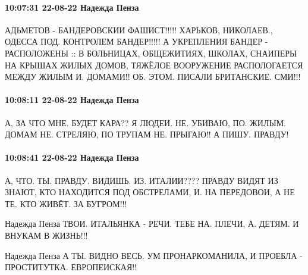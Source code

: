  
 
 
 
 

\paragraph{10:07:31 22-08-22 Надежда Пенза}

АДЬМЕТОВ - БАНДЕРОВСКИИ ФАШИСТ!!!!!
ХАРЬКОВ, НИКОЛАЕВ., ОДЕССА ПОД. КОНТРОЛЕМ БАНДЕР!!!!!
А УКРЕПЛЕНИЯ БАНДЕР -
РАСПОЛОЖЕНЫ :: В БОЛЬНИЦАХ, ОБЩЕЖИТИЯХ, ШКОЛАХ, СНАИПЕРЫ НА КРЫШАХ ЖИЛЫХ ДОМОВ, ТЯЖЁЛОЕ ВООРУЖЕНИЕ РАСПОЛОГАЕТСЯ МЕЖДУ ЖИЛЫМ И. ДОМАМИ!!
ОБ. ЭТОМ. ПИСАЛИ
БРИТАНСКИЕ. СМИ!!!

\paragraph{10:08:11 22-08-22 Надежда Пенза}

А, ЗА ЧТО МНЕ. БУДЕТ КАРА??
Я ЛЮДЕИ. НЕ. УБИВАЮ, ПО. ЖИЛЫМ. ДОМАМ НЕ. СТРЕЛЯЮ, ПО ТРУПАМ НЕ. ПРЫГАЮ!!
А ПИШУ. ПРАВДУ!

\paragraph{10:08:41 22-08-22 Надежда Пенза}

А, ЧТО. ТЫ. ПРАВДУ. ВИДИШЬ. ИЗ. ИТАЛИИ???? ПРАВДУ ВИДЯТ ИЗ ЗНАЮТ, КТО НАХОДИТСЯ ПОД
ОБСТРЕЛАМИ, И. НА ПЕРЕДОВОИ, А НЕ ТЕ. КТО ЖИВЁТ. ЗА БУГРОМ!!!

Надежда Пенза
ТВОИ. ИТАЛЬЯНКА - РЕЧИ. ТЕБЕ НА. ПЛЕЧИ, А. ДЕТЯМ. И ВНУКАМ В ЖИЗНЬ!!!

Надежда Пенза
А ТЫ. ВИДНО ВЕСЬ. УМ ПРОНАРКОМАНИЛА, И ПРОЕБЛА - ПРОСТИТУТКА. ЕВРОПЕИСКАЯ!!
